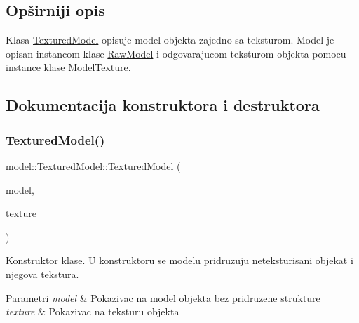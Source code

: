 \subsection{Opširniji opis}
Klasa \hyperlink{classmodel_1_1TexturedModel}{Textured\+Model} opisuje model objekta zajedno sa teksturom. Model je opisan instancom klase \hyperlink{classmodel_1_1RawModel}{Raw\+Model} i odgovarajucom teksturom objekta pomocu instance klase Model\+Texture. 

\subsection{Dokumentacija konstruktora i destruktora}
\mbox{\label{classmodel_1_1TexturedModel_affbb36dc66a365064576e186a975777a}} 
\subsubsection{\texorpdfstring{Textured\+Model()}{TexturedModel()}}
{\footnotesize\ttfamily model\+::\+Textured\+Model\+::\+Textured\+Model (\begin{DoxyParamCaption}\item[{\hyperlink{classmodel_1_1RawModel}{Raw\+Model} $\ast$}]{model,  }\item[{\hyperlink{classtexture_1_1ModelTexture}{Model\+Texture} $\ast$}]{texture }\end{DoxyParamCaption})}



Konstruktor klase. U konstruktoru se modelu pridruzuju neteksturisani objekat i njegova tekstura. 


\begin{DoxyParams}{Parametri}
{\em model} & Pokazivac na model objekta bez pridruzene strukture \\
\hline
{\em texture} & Pokazivac na teksturu objekta \\
\hline
\end{DoxyParams}
\mbox{\label{classmodel_1_1TexturedModel_a8a11ba96d5a73a962a2ffcf8c5a53afe}} 
